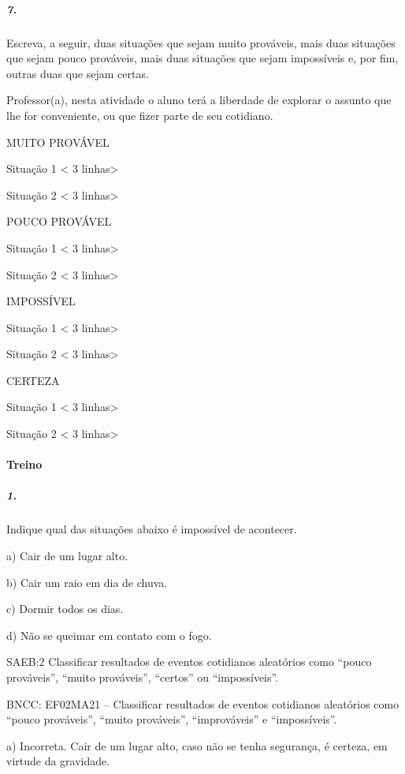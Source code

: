 \subparagraph{7.}\label{section-74}

Escreva, a seguir, duas situações que sejam muito prováveis, mais duas
situações que sejam pouco prováveis, mais duas situações que sejam
impossíveis e, por fim, outras duas que sejam certas.

Professor(a), nesta atividade o aluno terá a liberdade de explorar o
assunto que lhe for conveniente, ou que fizer parte de seu cotidiano.


MUITO PROVÁVEL

Situação 1 \textless{} 3 linhas\textgreater{}

Situação 2 \textless{} 3 linhas\textgreater{}

POUCO PROVÁVEL

Situação 1 \textless{} 3 linhas\textgreater{}

Situação 2 \textless{} 3 linhas\textgreater{}

IMPOSSÍVEL

Situação 1 \textless{} 3 linhas\textgreater{}

Situação 2 \textless{} 3 linhas\textgreater{}

CERTEZA

Situação 1 \textless{} 3 linhas\textgreater{}

Situação 2 \textless{} 3 linhas\textgreater{}

\paragraph{Treino}\label{treino-5}

\subparagraph{1.}\label{section-75}

Indique qual das situações abaixo é impossível de acontecer.

a) Cair de um lugar alto.

b) Cair um raio em dia de chuva.

c) Dormir todos os dias.

d) Não se queimar em contato com o fogo.

SAEB:2 Classificar resultados de eventos cotidianos aleatórios como ``pouco prováveis'', ``muito prováveis'', ``certos'' ou ``impossíveis''.

BNCC: EF02MA21 -- Classificar resultados de eventos cotidianos aleatórios como ``pouco prováveis'', ``muito prováveis'', ``improváveis'' e ``impossíveis''.

a) Incorreta. Cair de um lugar alto, caso não se tenha segurança, é certeza, em virtude da gravidade.


